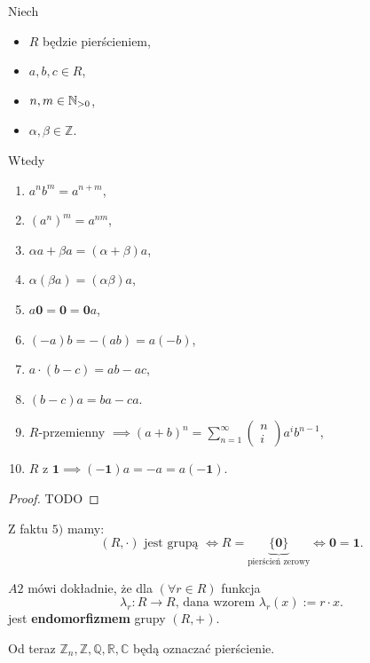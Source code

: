 \begin{fact}
	Niech 
	\begin{itemize}
		\item $R$ będzie pierścieniem,
		\item $a,b,c \in R$,
		\item $n,m \in \mathbb{N}_{>0}$,
		\item $\alpha , \beta \in \mathbb{Z} $.
	\end{itemize}
	Wtedy
	\begin{enumerate}[label=\arabic*)]
		\item $a^{n}b^{m} = a^{n+m}$,
		\item $\left( a^{n} \right)^{m} = a^{nm}$,
		\item $\alpha a + \beta a = \left( \alpha +\beta  \right) a$,
		\item $\alpha \left( \beta a \right) = \left( \alpha \beta  \right) a$,
		\item $a\mathbf{0} = \mathbf{0} = \mathbf{0}a$,
		\item $\left( -a \right) b = -\left( ab \right) = a\left( -b \right) $,
		\item $a\cdot \left(b-c  \right) = ab-ac$,
		\item $\left( b-c \right) a = ba-ca$.
		\item $R$-przemienny $\implies \left( a+b \right)^{n} = \sum_{n = 1}^{\infty} \begin{pmatrix} n \\ i \end{pmatrix} a^{i}b^{n-1}$,
		\item $R$ z $\mathbf{1} \implies \left( -\mathbf{1} \right) a = -a = a\left( -\mathbf{1} \right) $.
	\end{enumerate}
\end{fact}
\begin{proof}
	TODO
\end{proof} 
\begin{remark}
	Z faktu $5)$ mamy: 
	\[
		\left( R, \cdot  \right) \text{ jest grupą }\iff R = \underbrace{ \{\mathbf{0}\} }_{\text{pierścień zerowy}}\iff \mathbf{0} = \mathbf{1}
	.\] 
\end{remark} 
\begin{remark}
	$A2$ mówi dokładnie, że dla  $\left(\forall r\in R \right) $ funkcja
	\[
	\lambda_{r}: R \to R\text{, dana wzorem } \lambda_{r}\left( x \right) := r\cdot x
	.\] 
	jest \textbf{endomorfizmem} grupy $\left( R,+ \right) $.
\end{remark} 
\begin{remark}
	Od teraz  $\mathbb{Z} _{n}, \mathbb{Z} ,\mathbb{Q} ,\mathbb{R} ,\mathbb{C} $ będą oznaczać pierścienie.
\end{remark} 

